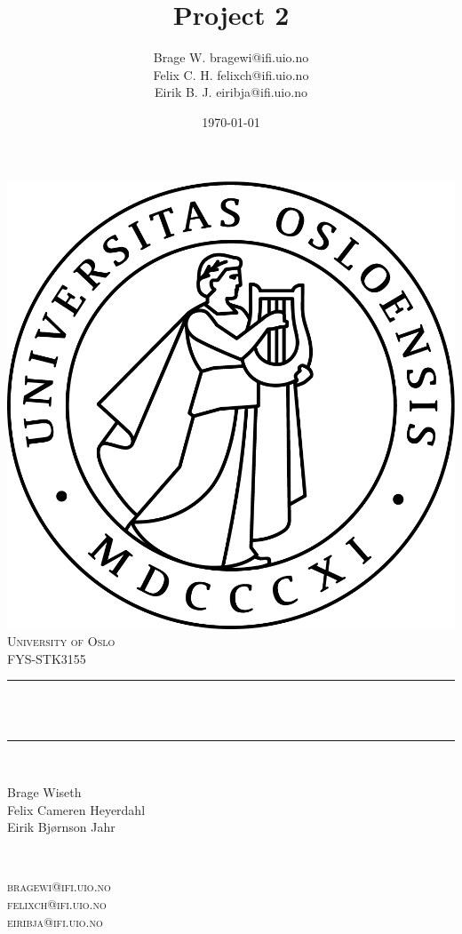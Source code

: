 \documentclass[twoside,11pt]{report}
\title{{\huge Project 2}}
\author{\name Brage W. \email bragewi@ifi.uio.no\\
    \name Felix C. H.  \email felixch@ifi.uio.no \\
\name Eirik B. J. \email eiribja@ifi.uio.no}
\date{\today}											%
\begin{document}

\begin{titlepage}
    \centering
    \vspace*{0.5 cm}
    \includegraphics[scale = 0.75]{uio.jpg}\\[1.0 cm]	%
    \textsc{\LARGE University of Oslo}\\[2.0 cm]	    %
    \textsc{\Large FYS-STK3155}\\[0.5 cm]				%
    \rule{\linewidth}{0.2 mm} \\[0.4 cm]
    { \huge \bfseries \@title}\\
    \rule{\linewidth}{0.2 mm} \\[1.5 cm]

    \begin{minipage}{0.4\textwidth}
        \begin{flushleft} \normalsize
            Brage Wiseth\\
            Felix Cameren Heyerdahl\\
            Eirik Bjørnson Jahr\\
        \end{flushleft}
    \end{minipage}~
    \begin{minipage}{0.4\textwidth}
        \begin{flushright} \normalsize
            \textsc{
                bragewi@ifi.uio.no\\
                felixch@ifi.uio.no\\
                eiribja@ifi.uio.no\\
            }
        \end{flushright}


\end{minipage}
\end{titlepage}
\end{document}
